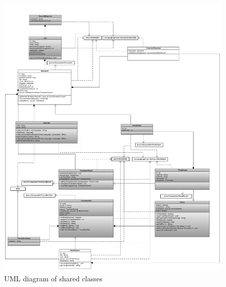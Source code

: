 \begin{figure}
\begin{center}
\includegraphics[scale=0.38]{figures/shared.pdf}
\end{center}
\caption{UML diagram of shared classes}
\label{fig:shared_uml}
\end{figure}

